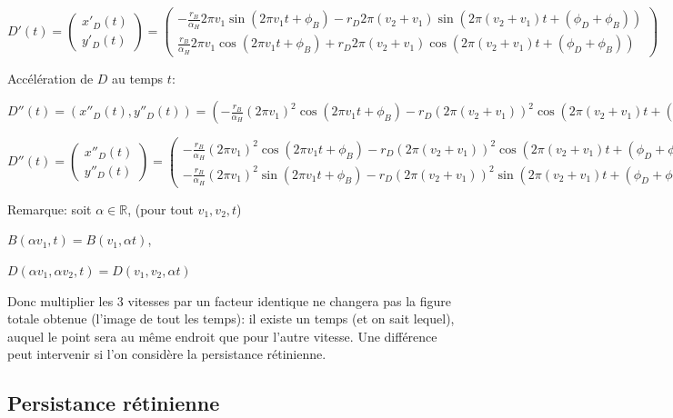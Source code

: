 \documentclass[11pt,a4paper]{article}
\newcommand{\R}{\mathbb R}%
\begin{document}
$
D'(t)=
\begin{pmatrix}
x'_D(t) \\ 
y'_D(t)
\end{pmatrix}
=
\begin{pmatrix}
-\frac{r_B}{\alpha_H} 2 \pi v_1 \sin(2 \pi v_1 t + \phi_B) - r_D 2 \pi (v_2 + v _1) \sin(2 \pi (v_2 + v _1)t + (\phi_D + \phi_B)) \\ 
\frac{r_B}{\alpha_H} 2 \pi  v_1 \cos(2 \pi v_1 t + \phi_B ) + r_D  2 \pi (v_2 + v _1) \cos(2 \pi (v_2 +v_1)t +  (\phi_D + \phi_B))  
\end{pmatrix}
$


Accélération de $D$ au temps $t$:

$ D''(t) = (x''_D(t),y''_D(t)) = (-\frac{r_B}{\alpha_H} (2 \pi v_1)^2 \cos(2 \pi v_1 t + \phi_B) - r_D  (2 \pi (v_2 + v _1))^2 \cos(2 \pi (v_2 + v _1)t + (\phi_D + \phi_B)), - \frac{r_B}{\alpha_H} (2 \pi  v_1)^2 \sin(2 \pi v_1 t + \phi_B ) - r_D  (2 \pi (v_2 + v _1))^2 \sin(2 \pi (v_2 +v_1)t +  (\phi_D + \phi_B))  )$


$
D''(t)=
\begin{pmatrix}
x''_D(t) \\ 
y''_D(t)
\end{pmatrix}
=
\begin{pmatrix}
-\frac{r_B}{\alpha_H} (2 \pi v_1)^2 \cos(2 \pi v_1 t + \phi_B) - r_D  (2 \pi (v_2 + v _1))^2 \cos(2 \pi (v_2 + v _1)t + (\phi_D + \phi_B)) \\ 
- \frac{r_B}{\alpha_H} (2 \pi  v_1)^2 \sin(2 \pi v_1 t + \phi_B ) - r_D  (2 \pi (v_2 + v _1))^2 \sin(2 \pi (v_2 +v_1)t +  (\phi_D + \phi_B))  )  
\end{pmatrix}
$



Remarque: soit $\alpha \in \R$, (pour tout $v_1,v_2,t$)

$B(\alpha v_1,t) = B(v_1,\alpha t)$,

$D(\alpha v_1,\alpha v_2,t) = D(v_1,v_2,\alpha t)$

Donc multiplier les 3 vitesses par un facteur identique ne changera pas la figure totale obtenue (l'image de tout les temps): il existe un temps (et on sait lequel), auquel le point sera au même endroit que pour l'autre vitesse. Une différence peut intervenir si l'on considère la persistance rétinienne.




\subsection{Persistance rétinienne}
\end{document}
